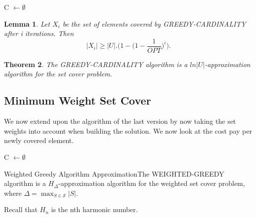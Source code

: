 \documentclass[twoside]{article}
\newcounter{lecnum}
\newtheorem{theorem}{Theorem}[lecnum]
\newtheorem{lemma}[theorem]{Lemma}
\begin{document}
\begin{algorithm}
\DontPrintSemicolon
{}
C $\gets \emptyset$\;

\;
\caption{{\sc GREEDY Algorithm for Cardinality}}
\label{algo:duplicate}
\end{algorithm}

\begin{lemma}Let $X_i$ be the set of elements covered by GREEDY-CARDINALITY after i iterations. Then 
$$
|X_i| \geq |U|.\bigg(1 - \bigg(1 - \frac{1}{OPT} \bigg)^i \bigg).
$$
\end{lemma}

\begin{theorem}The GREEDY-CARDINALITY algorithm is a $ln |U|$-approximation algorithm for the set cover problem.
\end{theorem}

\subsection{Minimum Weight Set Cover}
We now extend upon the algorithm of the last version by now taking the set weights into account when building the solution. We now look at the cost pay per newly covered element.

\begin{algorithm}
\DontPrintSemicolon
{}
C $\gets \emptyset$\;

\;
\caption{{\sc WEIGHTED GREEDY Algorithm}}
\label{algo:duplicate}
\end{algorithm}

\begin{theorem_exam}{Weighted Greedy Algorithm Approximation}{}The WEIGHTED-GREEDY algorithm is a $H_{\Delta}$-approximation algorithm for the weighted set cover problem, where $\Delta = \max_{S \in \mathcal{S}}|S|.$
\end{theorem_exam}

Recall that $H_n$ is the nth harmonic number.
\end{document}
